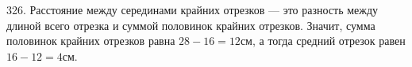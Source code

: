 326. Расстояние между серединами крайних отрезков --- это разность между длиной всего отрезка и суммой половинок крайних отрезков. Значит, сумма половинок крайних отрезков равна $28-16=12$см, а тогда средний отрезок равен $16-12=4$см.\\
